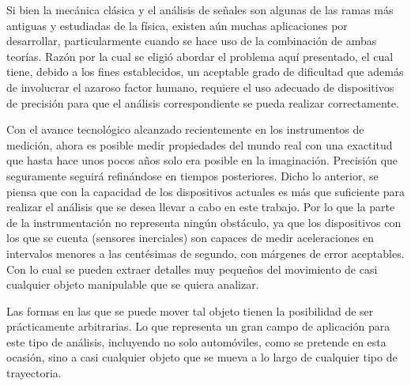 Si bien la mecánica clásica y el análisis de señales son algunas de las ramas más antiguas y estudiadas de la física, existen aún muchas aplicaciones por desarrollar, particularmente cuando se hace uso de la combinación de ambas teorías.
Razón por la cual se eligió abordar el problema aquí presentado, el cual tiene, debido a los fines establecidos, un aceptable grado de dificultad que además de involucrar el azaroso factor humano, requiere el uso adecuado de dispositivos de precisión para que el análisis correspondiente se pueda realizar correctamente.

Con el avance tecnológico alcanzado recientemente en los instrumentos de medición, ahora es posible medir propiedades del mundo real con una exactitud que hasta hace unos pocos años solo era posible en la imaginación. 
Precisión que seguramente seguirá refinándose en tiempos posteriores. 
Dicho lo anterior, se piensa que con la capacidad de los dispositivos actuales es más que suficiente para realizar el análisis que se desea llevar a cabo en este trabajo. 
Por lo que la parte de la instrumentación no representa ningún obstáculo, ya que los dispositivos con los que se cuenta (sensores inerciales) son capaces de medir aceleraciones en intervalos menores a las centésimas de segundo, con márgenes de error aceptables.
Con lo cual se pueden extraer detalles muy pequeños del movimiento de casi cualquier objeto manipulable que se quiera analizar.

Las formas en las que se puede mover tal objeto tienen la posibilidad de ser prácticamente arbitrarias.
Lo que representa un gran campo de aplicación para este tipo de análisis, incluyendo no solo automóviles, como se pretende en esta ocasión, sino a casi cualquier objeto que se mueva a lo largo de cualquier tipo de trayectoria.

